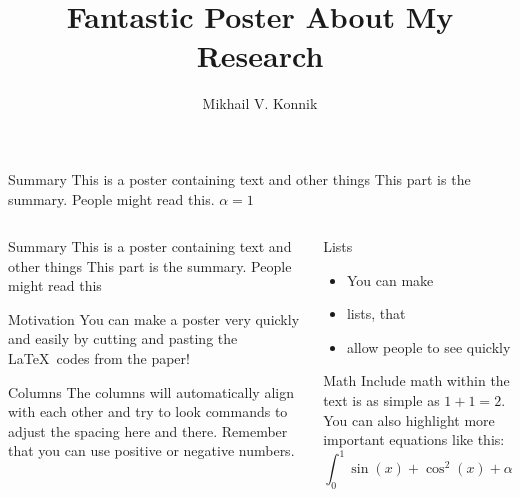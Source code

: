 \documentclass[final,hyperref={pdfpagelabels=false}]{beamer}
\title{Fantastic Poster About My Research}
\author{Mikhail V. Konnik}
\institute{The University of Newcastle, Australia}
\begin{document}
\begin{frame}{}

      \begin{block}{Summary}
        This is a poster containing text and other things
        This part is the summary.  People might read this. $\alpha = 1$
      \end{block}
% 
  \begin{columns}[t]
% 
    \begin{column}{0.32\linewidth}

      \begin{block}{Summary}
        This is a poster containing text and other things
        This part is the summary.  People might read this
      \end{block}

      \begin{block}{Motivation}
        You can make a poster very quickly and easily by cutting and pasting
        the \LaTeX~codes from the paper!
      \end{block}

      \begin{block}{Columns}
        The columns will automatically align with each other and try to look
        commands to adjust the spacing here and there.  Remember that you can
        use positive or negative numbers.
      \end{block}

    \end{column}%

    \begin{column}{0.32\linewidth}

      \begin{block}{Lists}
        \begin{itemize}
          \item You can make
          \item lists, that
          \item allow people to see quickly
        \end{itemize}
      \end{block}

      \begin{block}{Math}
        Include math within the text is as simple as $1+1=2$.  You can also
        highlight more important equations like this:
        \begin{equation}
          \int_0^1\sin(x)+\cos^2(x)+\alpha x~d\!x
        \end{equation}
      \end{block}


\end{column}
\end{columns}
\end{frame}
\end{document}
